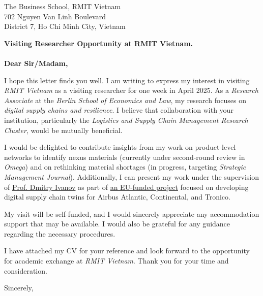 \documentclass[DIN, pagenumber=false, parskip=half,%
               fromalign=right, 
               fromrule=false]{scrlttr2}
\begin{document}
 
\begin{letter}{The Business School, RMIT Vietnam \\
               702 Nguyen Van Linh Boulevard \\
               District 7, Ho Chi Minh City, Vietnam}



\opening{}
\vspace{-1cm}
\textbf{Visiting Researcher Opportunity at RMIT Vietnam.}\\\\
\textbf{Dear Sir/Madam,}

I hope this letter finds you well. I am writing to express my interest in visiting \textit{RMIT Vietnam} as a visiting researcher for one week in April 2025. As a \textit{Research Associate} at the \textit{Berlin School of Economics and Law}, my research focuses on \textit{digital supply chains and resilience}. I believe that collaboration with your institution, particularly the \textit{Logistics and Supply Chain Management Research Cluster}, would be mutually beneficial.  

I would be delighted to contribute insights from my work on product-level networks to identify nexus materials (currently under second-round review in \textit{Omega}) and on rethinking material shortages (in progress, targeting \textit{Strategic Management Journal}). Additionally, I can present my work under the supervision of \href{https://scholar.google.de/citations?hl=de&user=yxK6B_oAAAAJ}{Prof. Dmitry Ivanov} as part of \href{https://accurateproject.eu/}{an EU-funded project} focused on developing digital supply chain twins for Airbus Atlantic, Continental, and Tronico.  

My visit will be self-funded, and I would sincerely appreciate any accommodation support that may be available. I would also be grateful for any guidance regarding the necessary procedures.  

I have attached my CV for your reference and look forward to the opportunity for academic exchange at \textit{RMIT Vietnam}. Thank you for your time and consideration.  

\closing{Sincerely,}


\end{letter}
 
\end{document}
